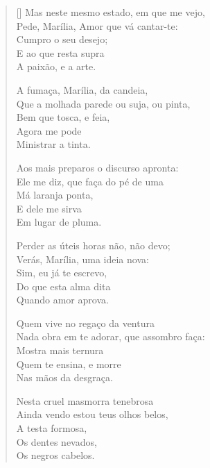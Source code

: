 \begin{enumerate}
\begin{verse}[\versewidth]
Mas neste mesmo estado, em que me vejo, \\
Pede, Marília, Amor que vá cantar-te: \\
\hspace{2em} Cumpro o seu desejo; \\
\hspace{2em} E ao que resta supra \\
\hspace{2em} A paixão, e a arte.
						
A fumaça, Marília, da candeia, \\
Que a molhada parede ou suja, ou pinta, \\
\hspace{2em} Bem que tosca, e feia, \\
\hspace{2em} Agora me pode \\
\hspace{2em} Ministrar a tinta.
						
Aos mais preparos o discurso apronta: \\
Ele me diz, que faça do pé de uma \\
\hspace{2em} Má laranja ponta, \\
\hspace{2em} E dele me sirva \\
\hspace{2em} Em lugar de pluma.
						
Perder as úteis horas não, não devo; \\
Verás, Marília, uma ideia nova: \\
\hspace{2em} Sim, eu já te escrevo, \\
\hspace{2em} Do que esta alma dita \\
\hspace{2em} Quando amor aprova.
						
Quem vive no regaço da ventura \\
Nada obra em te adorar, que assombro faça: \\
\hspace{2em} Mostra mais ternura \\
\hspace{2em} Quem te ensina, e morre \\
\hspace{2em} Nas mãos da desgraça.
						
Nesta cruel masmorra tenebrosa \\
Ainda vendo estou teus olhos belos, \\
\hspace{2em} A testa formosa, \\
\hspace{2em} Os dentes nevados, \\
\hspace{2em} Os negros cabelos.
						

\end{verse}
\end{enumerate}
